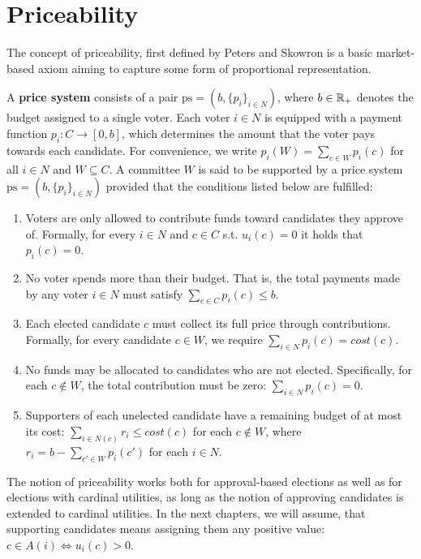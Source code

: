 \section{Priceability}
The concept of priceability, first defined by Peters and Skowron \cite{ProportionalityAndLimits} is a basic market-based axiom aiming to capture some form of proportional representation.
\begin{definition}
A \textbf{price system} consists of a pair $\text{ps} = (b, \{p_i\}_{i\in N})$, where $b\in \mathbb{R}_+$ denotes the budget assigned to a single voter. Each voter $i \in N$ is equipped with a payment function $p_i : C \to [0,b]$, which determines the amount that the voter pays towards each candidate. For convenience, we write $p_i(W)=\sum_{c\in W}p_i(c)$ for all $i\in N$ and $W\subseteq C$. A committee $W$ is said to be supported by a price system $\text{ps}=(b, \{p_i\}_{i\in N})$ provided that the conditions listed below are fulfilled:
\begin{enumerate}[label=(C\arabic*)]
    \item Voters are only allowed to contribute funds toward candidates they approve of. Formally, for every $ i \in N $ and $ c \in C $ s.t. $u_i(c)=0$ it holds that $ p_i(c) = 0 $.
    
    \item No voter spends more than their budget. That is, the total payments made by any voter $ i \in N $ must satisfy $ \sum_{c \in C} p_i(c) \leq b$.
    
    \item Each elected candidate $c$ must collect its full price through contributions. Formally, for every candidate $ c \in W $, we require $ \sum_{i \in N} p_i(c) = cost(c)$.
    
    \item No funds may be allocated to candidates who are not elected. Specifically, for each \( c \notin W \), the total contribution must be zero: \( \sum_{i \in N} p_i(c) = 0 \).

    \item Supporters of each unelected candidate have a remaining budget of at most its cost: $\sum_{i\in N(c)}r_i\le cost(c)$ for each $c\notin W$, where $r_i=b-\sum_{c'\in W}p_i(c')$ for each $i\in N$.
\end{enumerate}
\end{definition}
The notion of priceability works both for approval-based elections as well as for elections with cardinal utilities, as long as the notion of approving candidates is extended to cardinal utilities. In the next chapters, we will assume, that supporting candidates means assigning them any positive value: $c \in A(i) \iff u_i(c)>0$.
